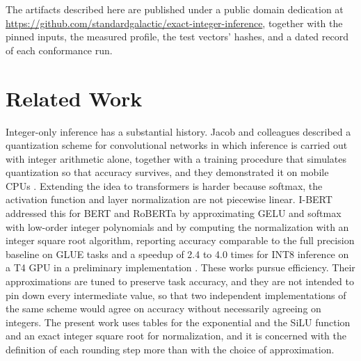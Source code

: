 \documentclass[11pt]{article}
\begin{document}
The artifacts described here are published under a public domain dedication at \url{https://github.com/standardgalactic/exact-integer-inference}, together with the pinned inputs, the measured profile, the test vectors' hashes, and a dated record of each conformance run.

\section{Related Work}

Integer-only inference has a substantial history. Jacob and colleagues described a quantization scheme for convolutional networks in which inference is carried out with integer arithmetic alone, together with a training procedure that simulates quantization so that accuracy survives, and they demonstrated it on mobile CPUs \cite{jacob2018}. Extending the idea to transformers is harder because softmax, the activation function and layer normalization are not piecewise linear. I-BERT addressed this for BERT and RoBERTa by approximating GELU and softmax with low-order integer polynomials and by computing the normalization with an integer square root algorithm, reporting accuracy comparable to the full precision baseline on GLUE tasks and a speedup of 2.4 to 4.0 times for INT8 inference on a T4 GPU in a preliminary implementation \cite{kim2021}. These works pursue efficiency. Their approximations are tuned to preserve task accuracy, and they are not intended to pin down every intermediate value, so that two independent implementations of the same scheme would agree on accuracy without necessarily agreeing on integers. The present work uses tables for the exponential and the SiLU function and an exact integer square root for normalization, and it is concerned with the definition of each rounding step more than with the choice of approximation.
\end{document}
